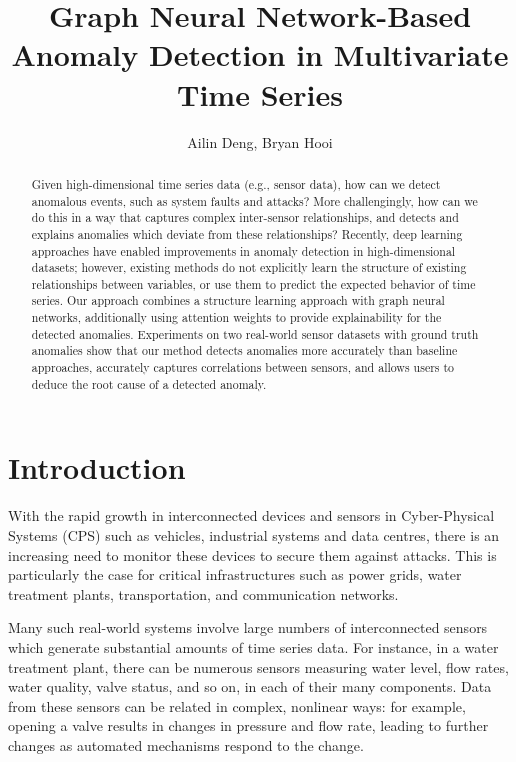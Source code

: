 \documentclass[letterpaper]{article} %
\title{Graph Neural Network-Based Anomaly Detection in Multivariate Time Series}
\author {
    Ailin Deng, Bryan Hooi \\
}
\begin{document}
\maketitle

\begin{abstract}

Given high-dimensional time series data (e.g., sensor data), how can we detect anomalous events, such as system faults and attacks? More challengingly, how can we do this in a way that captures complex inter-sensor relationships, and detects and explains anomalies which deviate from these relationships? Recently, deep learning approaches have enabled improvements in anomaly detection in high-dimensional datasets; however, existing methods do not explicitly learn the structure of existing relationships between variables, or use them to predict the expected behavior of time series. Our approach combines a structure learning approach with graph neural networks, additionally using attention weights to provide explainability for the detected anomalies. Experiments on two real-world sensor datasets with ground truth anomalies show that our method detects anomalies more accurately than baseline approaches, accurately captures correlations between sensors, and allows users to deduce the root cause of a detected anomaly.


\end{abstract}


\section{Introduction}

With the rapid growth in interconnected devices and sensors in Cyber-Physical Systems (CPS) such as vehicles, industrial systems and data centres, there is an increasing need to monitor these devices to secure them against attacks. This is particularly the case for critical infrastructures such as power grids, water treatment plants, transportation, and communication networks. 

Many such real-world systems involve large numbers of interconnected sensors which generate substantial amounts of time series data. For instance, in a water treatment plant, there can be numerous sensors measuring water level, flow rates, water quality, valve status, and so on, in each of their many components. Data from these sensors can be related in complex, nonlinear ways: for example, opening a valve results in changes in pressure and flow rate, leading to further changes as automated mechanisms respond to the change.
\end{document}
